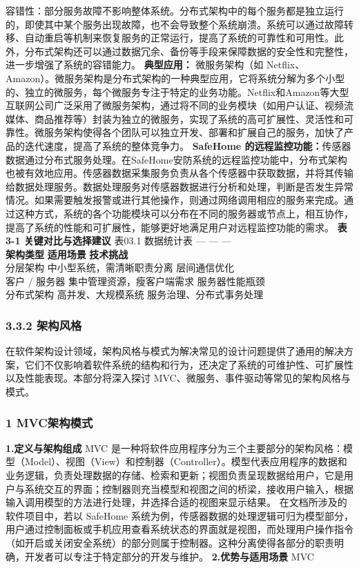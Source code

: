 容错性：部分服务故障不影响整体系统。分布式架构中的每个服务都是独立运行的，即使其中某个服务出现故障，也不会导致整个系统崩溃。系统可以通过故障转移、自动重启等机制来恢复服务的正常运行，提高了系统的可靠性和可用性。此外，分布式架构还可以通过数据冗余、备份等手段来保障数据的安全性和完整性，进一步增强了系统的容错能力。 \textbf{典型应用：} 微服务架构（如 Netflix、Amazon）。微服务架构是分布式架构的一种典型应用，它将系统分解为多个小型的、独立的微服务，每个微服务专注于特定的业务功能。Netflix和Amazon等大型互联网公司广泛采用了微服务架构，通过将不同的业务模块（如用户认证、视频流媒体、商品推荐等）封装为独立的微服务，实现了系统的高可扩展性、灵活性和可靠性。微服务架构使得各个团队可以独立开发、部署和扩展自己的服务，加快了产品的迭代速度，提高了系统的整体竞争力。 \textbf{SafeHome 的远程监控功能：}传感器数据通过分布式服务处理。在SafeHome安防系统的远程监控功能中，分布式架构也被有效地应用。传感器数据采集服务负责从各个传感器中获取数据，并将其传输给数据处理服务。数据处理服务对传感器数据进行分析和处理，判断是否发生异常情况。如果需要触发报警或进行其他操作，则通过网络调用相应的服务来完成。通过这种方式，系统的各个功能模块可以分布在不同的服务器或节点上，相互协作，提高了系统的性能和可扩展性，能够更好地满足用户对远程监控功能的需求。 \textbf{表3-1 关键对比与选择建议} 表03.1 数据统计表 --- \textbar{} --- \textbar{} --- \textbar{}\\ \textbf{架构类型} \textbar{} \textbf{适用场景} \textbar{} \textbf{技术挑战} \textbar{}\\ 分层架构 \textbar{} 中小型系统，需清晰职责分离 \textbar{} 层间通信优化 \textbar{}\\ 客户 / 服务器 \textbar{} 集中管理资源，瘦客户端需求 \textbar{} 服务器性能瓶颈 \textbar{}\\ 分布式架构 \textbar{} 高并发、大规模系统 \textbar{} 服务治理、分布式事务处理 \textbar{} \subsubsection{3.3.2 架构风格}\label{ux67b6ux6784ux98ceux683c} 在软件架构设计领域，架构风格与模式为解决常见的设计问题提供了通用的解决方案，它们不仅影响着软件系统的结构和行为，还决定了系统的可维护性、可扩展性以及性能表现。本部分将深入探讨 MVC、微服务、事件驱动等常见的架构风格与模式。 \subsubsection{1 MVC架构模式}\label{mvcux67b6ux6784ux6a21ux5f0f} \textbf{1.定义与架构组成} MVC 是一种将软件应用程序分为三个主要部分的架构风格：模型（Model）、视图（View）和控制器（Controller）。模型代表应用程序的数据和业务逻辑，负责处理数据的存储、检索和更新；视图负责呈现数据给用户，它是用户与系统交互的界面；控制器则充当模型和视图之间的桥梁，接收用户输入，根据输入调用模型的方法进行处理，并选择合适的视图来显示结果。 在文档所涉及的软件项目中，若以 SafeHome 系统为例，传感器数据的处理逻辑可归为模型部分，用户通过控制面板或手机应用查看系统状态的界面就是视图，而处理用户操作指令（如开启或关闭安全系统）的部分则属于控制器。这种分离使得各部分的职责明确，开发者可以专注于特定部分的开发与维护。 \textbf{2.优势与适用场景} MVC 
